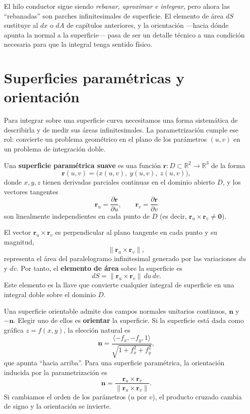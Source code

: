 \begin{rem}
El hilo conductor sigue siendo \emph{rebanar, aproximar e integrar}, pero ahora las ``rebanadas'' son parches infinitesimales de superficie. El elemento de área $dS$ sustituye al $dx$ o $dA$ de capítulos anteriores, y la orientación —hacia dónde apunta la normal a la superficie— pasa de ser un detalle técnico a una condición necesaria para que la integral tenga sentido físico.
\end{rem}

\section{Superficies paramétricas y orientación}

Para integrar sobre una superficie curva necesitamos una forma sistemática de describirla y de medir sus áreas infinitesimales. La parametrización cumple ese rol: convierte un problema geométrico en el plano de los parámetros $(u,v)$ en un problema de integración doble.

\begin{definition}
Una \textbf{superficie paramétrica suave} es una función $\mathbf{r}: D \subset \mathbb{R}^2 \to \mathbb{R}^3$ de la forma
\[
\mathbf{r}(u,v) = \bigl( x(u,v),\; y(u,v),\; z(u,v) \bigr),
\]
donde $x,y,z$ tienen derivadas parciales continuas en el dominio abierto $D$, y los vectores tangentes
\[
\mathbf{r}_u = \frac{\partial \mathbf{r}}{\partial u}, \qquad
\mathbf{r}_v = \frac{\partial \mathbf{r}}{\partial v}
\]
son linealmente independientes en cada punto de $D$ (es decir, $\mathbf{r}_u \times \mathbf{r}_v \neq \mathbf{0}$).
\end{definition}

El vector $\mathbf{r}_u \times \mathbf{r}_v$ es perpendicular al plano tangente en cada punto y su magnitud,
\[
\|\mathbf{r}_u \times \mathbf{r}_v\|,
\]
representa el área del paralelogramo infinitesimal generado por las variaciones $du$ y $dv$. Por tanto, el \textbf{elemento de área} sobre la superficie es
\[
dS = \|\mathbf{r}_u \times \mathbf{r}_v\|\,du\,dv.
\]
Este elemento es la llave que convierte cualquier integral de superficie en una integral doble sobre el dominio $D$.

\begin{definition}
Una superficie orientable admite dos campos normales unitarios continuos, $\mathbf{n}$ y $-\mathbf{n}$. Elegir uno de ellos es \textbf{orientar} la superficie. Si la superficie está dada como gráfica $z = f(x,y)$, la elección natural es
\[
\mathbf{n} = \frac{\langle -f_x, -f_y, 1 \rangle}{\sqrt{1+f_x^2+f_y^2}},
\]
que apunta ``hacia arriba''. Para una superficie paramétrica, la orientación inducida por la parametrización es
\[
\mathbf{n} = \frac{\mathbf{r}_u \times \mathbf{r}_v}{\|\mathbf{r}_u \times \mathbf{r}_v\|}.
\]
Si cambiamos el orden de los parámetros ($u$ por $v$), el producto cruzado cambia de signo y la orientación se invierte.
\end{definition}

